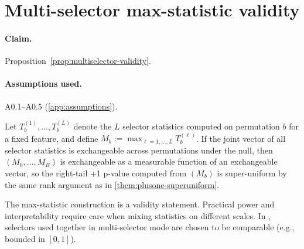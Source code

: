 \section{Multi-selector max-statistic validity}
\label{app:multiselector}

\paragraph{Claim.} Proposition~\ref{prop:multiselector-validity}.
\paragraph{Assumptions used.} A0.1--A0.5 (\cref{app:assumptions}).

Let $T^{(1)}_b, \dots, T^{(L)}_b$ denote the $L$ selector statistics computed on
permutation $b$ for a fixed feature, and define $M_b := \max_{\ell=1,\dots,L} T^{(\ell)}_b$.
If the joint vector of all selector statistics is exchangeable across
permutations under the null, then $(M_0, \dots, M_B)$ is exchangeable as a
measurable function of an exchangeable vector, so the right-tail +1 p-value computed from
$(M_b)$ is super-uniform by the same rank argument as in
\cref{them:plusone-superuniform}.

\begin{remark}
The max-statistic construction is a validity statement. Practical power and
interpretability require care when mixing statistics on different scales. In
\citrees, selectors used together in multi-selector mode are chosen to be
comparable (e.g., bounded in $[0,1]$).
\end{remark}
